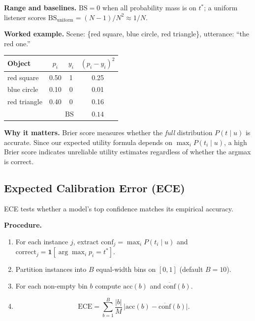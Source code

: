 \documentclass[11pt]{article}
\begin{document}
\textbf{Range and baselines.}
$\mathrm{BS} = 0$ when all probability mass is on $t^*$; a uniform listener scores
$\mathrm{BS}_{\text{uniform}} = (N-1)/N^2 \approx 1/N$.

\textbf{Worked example.}
Scene: \{red square, blue circle, red triangle\}, utterance: ``the red one.''

\begin{center}
\begin{tabular}{lccc}
\toprule
Object & $p_i$ & $y_i$ & $(p_i - y_i)^2$ \\
\midrule
red square   & 0.50 & 1 & 0.25 \\
blue circle  & 0.10 & 0 & 0.01 \\
red triangle & 0.40 & 0 & 0.16 \\
\midrule
\multicolumn{3}{r}{$\mathrm{BS}$} & $0.14$ \\
\bottomrule
\end{tabular}
\end{center}

\textbf{Why it matters.}
Brier score measures whether the \emph{full} distribution $P(t \mid u)$ is accurate.
Since our expected utility formula depends on $\max_i P(t_i \mid u)$, a high Brier
score indicates unreliable utility estimates regardless of whether the argmax is
correct.

\subsection{Expected Calibration Error (ECE)}

ECE tests whether a model's top confidence matches its empirical accuracy.

\textbf{Procedure.}
\begin{enumerate}
    \item For each instance $j$, extract $\mathrm{conf}_j = \max_i P(t_i \mid u)$ and
          $\mathrm{correct}_j = \mathbf{1}[\arg\max_i p_i = t^*]$.
    \item Partition instances into $B$ equal-width bins on $[0,1]$ (default $B = 10$).
    \item For each non-empty bin $b$ compute $\mathrm{acc}(b)$ and $\overline{\mathrm{conf}}(b)$.
    \item
    \begin{equation}
        \mathrm{ECE} = \sum_{b=1}^{B} \frac{|b|}{M}\,
        \bigl|\mathrm{acc}(b) - \overline{\mathrm{conf}}(b)\bigr|.
    \end{equation}
\end{enumerate}
\end{document}
